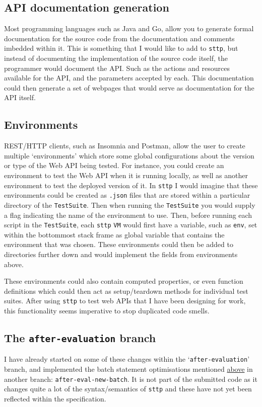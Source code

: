 \cprotect\subsection{API documentation generation}

Most programming languages such as Java and Go, allow you to generate formal documentation for the source code from the documentation and comments imbedded within it. This is something that I would like to add to \verb|sttp|, but instead of documenting the implementation of the source code itself, the programmer would document the API. Such as the actions and resources available for the API, and the parameters accepted by each. This documentation could then generate a set of webpages that would serve as documentation for the API itself.

\cprotect\subsection{Environments}
\label{sec:evaluation-environments}

REST/HTTP clients, such as Insomnia and Postman, allow the user to create multiple `environments' which store some global configurations about the version or type of the Web API being tested. For instance, you could create an environment to test the Web API when it is running locally, as well as another environment to test the deployed version of it. In \verb|sttp| I would imagine that these environments could be created as \verb|.json| files that are stored within a particular directory of the \verb|TestSuite|. Then when running the \verb|TestSuite| you would supply a flag indicating the name of the environment to use. Then, before running each script in the \verb|TestSuite|, each \verb|sttp| \verb|VM| would first have a variable, such as \verb|env|, set within the bottommost stack frame as global variable that contains the environment that was chosen. These environments could then be added to directories further down and would implement the fields from environments above.

These environments could also contain computed properties, or even function definitions which could then act as setup/teardown methods for individual test suites. After using \verb|sttp| to test web APIs that I have been designing for work, this functionality seems imperative to stop duplicated code smells.

\cprotect\subsection{The \verb|after-evaluation| branch}
\label{sec:evaluation-after-evaluation}

I have already started on some of these changes within the `\verb|after-evaluation|' branch, and implemented the batch statement optimisations mentioned \hyperref[sec:evaluation-batch-optimisation]{above} in another branch: \verb|after-eval-new-batch|. It is not part of the submitted code as it changes quite a lot of the syntax/semantics of \verb|sttp| and these have not yet been reflected within the specification.
